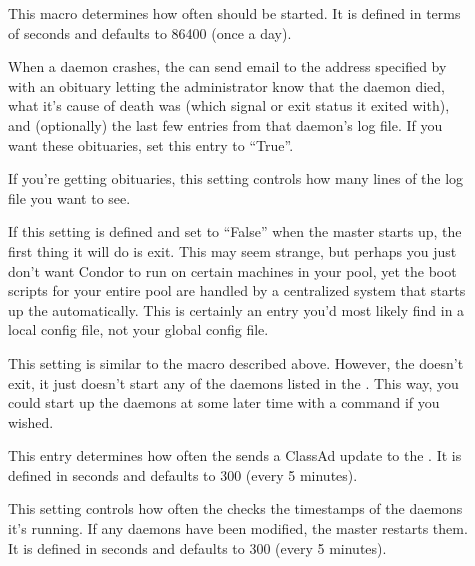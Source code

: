 \begin{description}
\item[] \label{param:PreenInterval} This macro
  determines how often  should be started.  It is
  defined in terms of seconds and defaults to 86400 (once a day).

\item[] \label{param:PublishObituaries}
  When a daemon crashes, the  can send email to the
  address specified by  with an obituary letting
  the administrator know that the daemon died, what it's cause of
  death was (which signal or exit status it exited with), and
  (optionally) the last few entries from that daemon's log file.  If
  you want these obituaries, set this entry to ``True''.

\item[] \label{param:ObituaryLogLength}
  If you're getting obituaries, this setting controls how many lines
  of the log file you want to see.

\item[] \label{param:StartMaster} If this setting
  is defined and set to ``False'' when the master starts up, the first
  thing it will do is exit.  This may seem strange, but perhaps you
  just don't want Condor to run on certain machines in your pool, yet
  the boot scripts for your entire pool are handled by a centralized
  system that starts up the  automatically.  This is
  certainly an entry you'd most likely find in a local config file,
  not your global config file.

\item[] \label{param:StartDaemons} This setting
  is similar to the  macro described above.
  However, the  doesn't exit, it just doesn't start any
  of the daemons listed in the .  This way, you
  could start up the daemons at some later time with a 
  command if you wished.

\item[]
  \label{param:MasterUpdateInterval} This entry determines how often
  the  sends a ClassAd update to the
  .  It is defined in seconds and defaults to 300
  (every 5 minutes).
  
\item[]
  \label{param:MasterCheckNewExecInterval} This
  setting controls how often the  checks the timestamps
  of the daemons it's running.  If any daemons have been modified, the
  master restarts them.  It is defined in seconds and defaults to 300
  (every 5 minutes).


\end{description}
